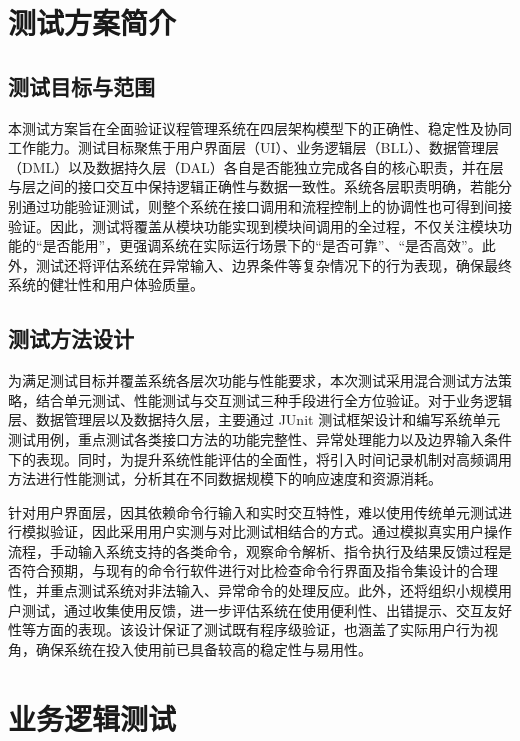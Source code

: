 \documentclass[a4paper, twoside, utf8]{ctexart}
\begin{document}
    \section{测试方案简介}

    \subsection{测试目标与范围}

    本测试方案旨在全面验证议程管理系统在四层架构模型下的正确性、稳定性及协同工作能力。测试目标聚焦于用户界面层（UI）、业务逻辑层（BLL）、数据管理层（DML）以及数据持久层（DAL）各自是否能独立完成各自的核心职责，并在层与层之间的接口交互中保持逻辑正确性与数据一致性。系统各层职责明确，若能分别通过功能验证测试，则整个系统在接口调用和流程控制上的协调性也可得到间接验证。因此，测试将覆盖从模块功能实现到模块间调用的全过程，不仅关注模块功能的“是否能用”，更强调系统在实际运行场景下的“是否可靠”、“是否高效”。此外，测试还将评估系统在异常输入、边界条件等复杂情况下的行为表现，确保最终系统的健壮性和用户体验质量。

    \subsection{测试方法设计}

    为满足测试目标并覆盖系统各层次功能与性能要求，本次测试采用混合测试方法策略，结合单元测试、性能测试与交互测试三种手段进行全方位验证。对于业务逻辑层、数据管理层以及数据持久层，主要通过 JUnit 测试框架设计和编写系统单元测试用例，重点测试各类接口方法的功能完整性、异常处理能力以及边界输入条件下的表现。同时，为提升系统性能评估的全面性，将引入时间记录机制对高频调用方法进行性能测试，分析其在不同数据规模下的响应速度和资源消耗。

    针对用户界面层，因其依赖命令行输入和实时交互特性，难以使用传统单元测试进行模拟验证，因此采用用户实测与对比测试相结合的方式。通过模拟真实用户操作流程，手动输入系统支持的各类命令，观察命令解析、指令执行及结果反馈过程是否符合预期，与现有的命令行软件进行对比检查命令行界面及指令集设计的合理性，并重点测试系统对非法输入、异常命令的处理反应。此外，还将组织小规模用户测试，通过收集使用反馈，进一步评估系统在使用便利性、出错提示、交互友好性等方面的表现。该设计保证了测试既有程序级验证，也涵盖了实际用户行为视角，确保系统在投入使用前已具备较高的稳定性与易用性。

    \section{业务逻辑测试}
\end{document}
